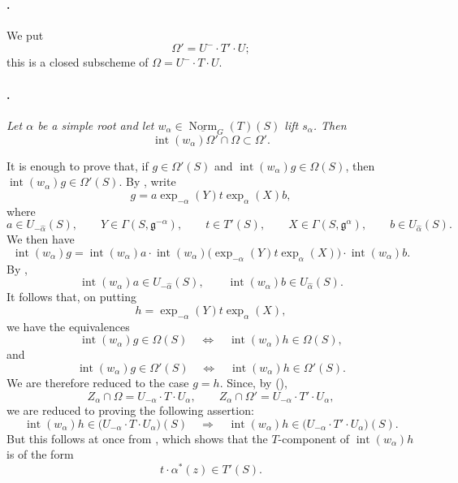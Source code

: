 \paragraph{.}
We put
\[
  \Omega'=U^-\cdot T'\cdot U;
\]
this is a closed subscheme of
\(\Omega=U^-\cdot T\cdot U\).

\paragraph{.}
{\itshape Let \(\alpha\) be a simple root and let
\(w_\alpha\in\underline{\operatorname{Norm}}_G(T)(S)\) lift
\(s_\alpha\). Then
\[
  \operatorname{int}(w_\alpha)\Omega'\cap\Omega\subset\Omega'.
\]}

It is enough to prove that, if \(g\in\Omega'(S)\) and
\(\operatorname{int}(w_\alpha)g\in\Omega(S)\), then
\(\operatorname{int}(w_\alpha)g\in\Omega'(S)\). By , write
\[
  g=a\exp_{-\alpha}(Y)t\exp_\alpha(X)b,
\]
where
\[
  a\in U_{-\widehat\alpha}(S),\qquad
  Y\in\Gamma(S,\mathfrak g^{-\alpha}),\qquad
  t\in T'(S),\qquad
  X\in\Gamma(S,\mathfrak g^\alpha),\qquad
  b\in U_{\widehat\alpha}(S).
\]
We then have
\[
  \operatorname{int}(w_\alpha)g
  =\operatorname{int}(w_\alpha)a\cdot
   \operatorname{int}(w_\alpha)
   \bigl(\exp_{-\alpha}(Y)t\exp_\alpha(X)\bigr)\cdot
   \operatorname{int}(w_\alpha)b.
\]
By \textup{},
\[
  \operatorname{int}(w_\alpha)a\in U_{-\widehat\alpha}(S),
  \qquad
  \operatorname{int}(w_\alpha)b\in U_{\widehat\alpha}(S).
\]
It follows that, on putting
\[
  h=\exp_{-\alpha}(Y)t\exp_\alpha(X),
\]
we have the equivalences
\[
  \operatorname{int}(w_\alpha)g\in\Omega(S)
  \quad\Longleftrightarrow\quad
  \operatorname{int}(w_\alpha)h\in\Omega(S),
\]
and
\[
  \operatorname{int}(w_\alpha)g\in\Omega'(S)
  \quad\Longleftrightarrow\quad
  \operatorname{int}(w_\alpha)h\in\Omega'(S).
\]
We are therefore reduced to the case \(g=h\). Since, by
\textup{()},
\[
  Z_\alpha\cap\Omega
  =U_{-\alpha}\cdot T\cdot U_\alpha,
  \qquad
  Z_\alpha\cap\Omega'
  =U_{-\alpha}\cdot T'\cdot U_\alpha,
\]
we are reduced to proving the following assertion:
\[
  \operatorname{int}(w_\alpha)h
  \in\bigl(U_{-\alpha}\cdot T\cdot U_\alpha\bigr)(S)
  \quad\Longrightarrow\quad
  \operatorname{int}(w_\alpha)h
  \in\bigl(U_{-\alpha}\cdot T'\cdot U_\alpha\bigr)(S).
\]
But this follows at once from , which shows that the
\(T\)-component of \(\operatorname{int}(w_\alpha)h\) is of the form
\[
  t\cdot\alpha^*(z)\in T'(S).
\]

